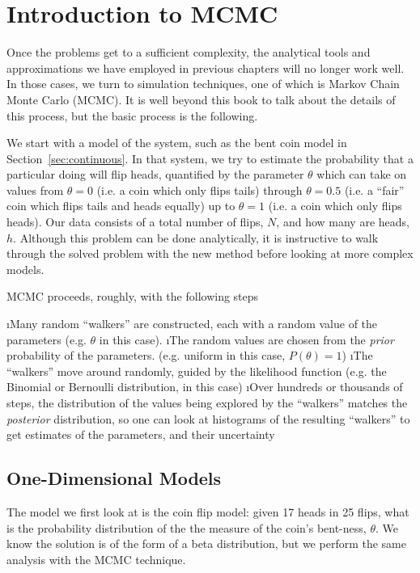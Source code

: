 \chapter{Introduction to MCMC}\label{ch:mcmc}

Once the problems get to a sufficient complexity, the analytical tools and approximations we have employed in previous chapters will no longer work well.  In those cases, we turn to simulation techniques, one of which is Markov Chain Monte Carlo (MCMC).  It is well beyond this book to talk about the details of this process, but the basic process is the following.

We start with a model of the system, such as the bent coin model in Section~\ref{sec:continuous}.  In that system, we try to estimate the probability that a particular doing will flip heads, quantified by the parameter $\theta$ which can take on values from $\theta=0$ (i.e. a coin which only flips tails) through $\theta=0.5$ (i.e. a ``fair'' coin which flips tails and heads equally) up to $\theta=1$ (i.e. a coin which only flips heads).  Our data consists of a total number of flips, $N$, and how many are heads, $h$.  Although this problem can be done analytically, it is instructive to walk through the solved problem with the new method before looking at more complex models.

MCMC proceeds, roughly, with the following steps

\be
\i Many random ``walkers'' are constructed, each with a random value of the parameters (e.g. $\theta$ in this case).  
\i The random values are chosen from the {\em prior} probability of the parameters.  (e.g. uniform in this case, $P(\theta)=1$)
\i The ``walkers'' move around randomly, guided by the likelihood function (e.g. the Binomial or Bernoulli distribution, in this case)
\i Over hundreds or thousands of steps, the distribution of the values being explored by the ``walkers'' matches the {\em posterior} distribution, so one can look at histograms of the resulting ``walkers'' to get estimates of the parameters, and their uncertainty
\ee

\section{One-Dimensional Models}

The model we first look at is the coin flip model: given 17 heads in 25 flips, what is the probability distribution of the the measure of the coin's bent-ness, $\theta$.  We know the solution is of the form of a beta distribution, but we perform the same analysis with the MCMC technique.  

